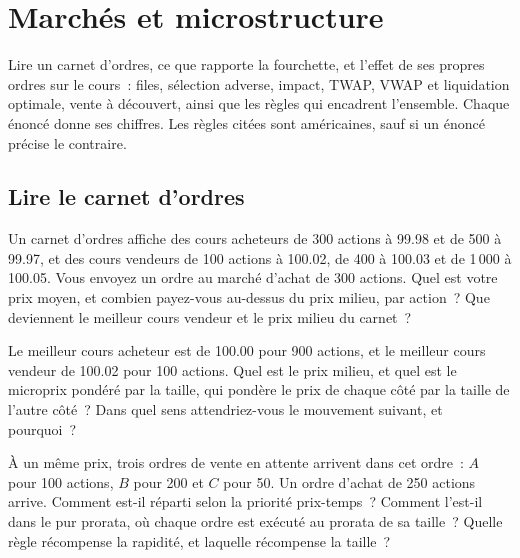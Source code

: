 \chapter{Marchés et microstructure}\label{ch:iv2:markets-and-microstructure}

\begin{ivtrains}
Lire un carnet d'ordres, ce que rapporte la fourchette, et l'effet de ses propres ordres sur le cours~: files, sélection adverse, impact, TWAP, VWAP et liquidation optimale, vente à découvert, ainsi que les règles qui encadrent l'ensemble. Chaque énoncé donne ses chiffres. Les règles citées sont américaines, sauf si un énoncé précise le contraire.
\end{ivtrains}

\section{Lire le carnet d'ordres}

\begin{question}\label{iq:iv2:markets-and-microstructure:1}
Un carnet d'ordres affiche des cours acheteurs de 300 actions à 99.98 et de 500 à 99.97, et des cours vendeurs de 100 actions à 100.02, de 400 à 100.03 et de 1\,000 à 100.05. Vous envoyez un ordre au marché d'achat de 300 actions. Quel est votre prix moyen, et combien payez-vous au-dessus du prix milieu, par action~? Que deviennent le meilleur cours vendeur et le prix milieu du carnet~?
\end{question}

\begin{question}\label{iq:iv2:markets-and-microstructure:2}
Le meilleur cours acheteur est de 100.00 pour 900 actions, et le meilleur cours vendeur de 100.02 pour 100 actions. Quel est le prix milieu, et quel est le microprix pondéré par la taille, qui pondère le prix de chaque côté par la taille de l'autre côté~? Dans quel sens attendriez-vous le mouvement suivant, et pourquoi~?
\end{question}

\begin{question}\label{iq:iv2:markets-and-microstructure:3}
À un même prix, trois ordres de vente en attente arrivent dans cet ordre~: $A$ pour 100 actions, $B$ pour 200 et $C$ pour 50. Un ordre d'achat de 250 actions arrive. Comment est-il réparti selon la priorité prix-temps~? Comment l'est-il dans le pur prorata, où chaque ordre est exécuté au prorata de sa taille~? Quelle règle récompense la rapidité, et laquelle récompense la taille~?
\end{question}

